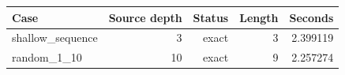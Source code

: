 {\small
\begin{tabular}{lrrrr}
\hline
Case & Source depth & Status & Length & Seconds \\
\hline
shallow\_sequence & 3 & exact & 3 & 2.399119 \\
random\_1\_10 & 10 & exact & 9 & 2.257274 \\
\hline
\end{tabular}
}
